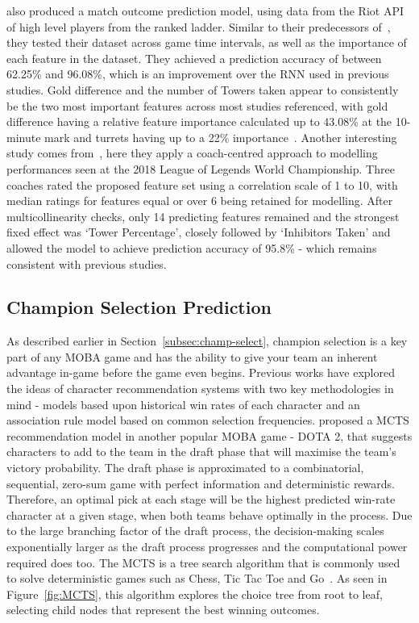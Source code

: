 \citet{lee2020predicting} also produced a match outcome prediction model, using data from the Riot API of high level players from the ranked ladder.
Similar to their predecessors of~\citet{silva2018continuous}, they tested their dataset across game time intervals, as well as the importance of each feature in the dataset.
They achieved a prediction accuracy of between 62.25\% and 96.08\%, which is an improvement over the \ac{RNN} used in previous studies.
Gold difference and the number of Towers taken appear to consistently be the two most important features across most studies referenced, with gold difference having a relative feature importance calculated up to 43.08\% at the 10-minute mark and turrets having up to a 22\% importance~\citep{lee2020predicting, ani2019victory, gaina2018league}.
Another interesting study comes from~\citet{novak2020performance}, here they apply a coach-centred approach to modelling performances seen at the 2018 League of Legends World Championship.
Three coaches rated the proposed feature set using a correlation scale of 1 to 10, with median ratings for features equal or over 6 being retained for modelling.
After multicollinearity checks, only 14 predicting features remained and the strongest fixed effect was `Tower Percentage', closely followed by `Inhibitors Taken' and allowed the model to achieve prediction accuracy of 95.8\% - which remains consistent with previous studies.

\subsection{Champion Selection Prediction}\label{subsec:Champion Selection Prediction}
As described earlier in Section~\ref{subsec:champ-select}, champion selection is a key part of any MOBA game and has the ability to give your team an inherent advantage in-game before the game even begins.
Previous works have explored the ideas of character recommendation systems with two key methodologies in mind - models based upon historical win rates of each character and an association rule model based on common selection frequencies.
\citet{chen2018art} proposed a \ac{MCTS} recommendation model in another popular MOBA game - DOTA 2, that suggests characters to add to the team in the draft phase that will maximise the team's victory probability.
The draft phase is approximated to a combinatorial, sequential, zero-sum game with perfect information and deterministic rewards.
Therefore, an optimal pick at each stage will be the highest predicted win-rate character at a given stage, when both teams behave optimally in the process.
Due to the large branching factor of the draft process, the decision-making scales exponentially larger as the draft process progresses and the computational power required does too.
The \ac{MCTS} is a tree search algorithm that is commonly used to solve deterministic games such as Chess, Tic Tac Toe and Go~\citep{alphago2016}.
As seen in Figure~\ref{fig:MCTS}, this algorithm explores the choice tree from root to leaf, selecting child nodes that represent the best winning outcomes.

